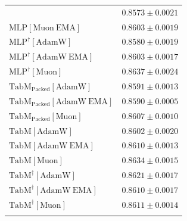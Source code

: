 \begin{longtable}{p{}p{}}
{\begin{tabular}{ll}
{\footnotesize $\mathrm{MLP[Muon]}$ } & {\footnotesize$0.8573 \pm 0.0021$}\\ 
{\footnotesize $\mathrm{MLP[Muon\ EMA]}$ } & {\footnotesize$0.8603 \pm 0.0019$}\\ 
{\footnotesize $\mathrm{MLP^\dagger[AdamW]}$ } & {\footnotesize$0.8580 \pm 0.0019$}\\ 
{\footnotesize $\mathrm{MLP^\dagger[AdamW\ EMA]}$ } & {\footnotesize$0.8603 \pm 0.0017$}\\ 
{\footnotesize $\mathrm{MLP^\dagger[Muon]}$ } & {\footnotesize$0.8637 \pm 0.0024$}\\ 
{\footnotesize $\mathrm{TabM_{\text{Packed}}[AdamW]}$ } & {\footnotesize$0.8591 \pm 0.0013$}\\ 
{\footnotesize $\mathrm{TabM_{\text{Packed}}[AdamW\ EMA]}$ } & {\footnotesize$0.8590 \pm 0.0005$}\\ 
{\footnotesize $\mathrm{TabM_{\text{Packed}}[Muon]}$ } & {\footnotesize$0.8607 \pm 0.0010$}\\ 
{\footnotesize $\mathrm{TabM[AdamW]}$ } & {\footnotesize$0.8602 \pm 0.0020$}\\ 
{\footnotesize $\mathrm{TabM[AdamW\ EMA]}$ } & {\footnotesize$0.8610 \pm 0.0013$}\\ 
{\footnotesize $\mathrm{TabM[Muon]}$ } & {\footnotesize$0.8634 \pm 0.0015$}\\ 
{\footnotesize $\mathrm{TabM^\dagger[AdamW]}$ } & {\footnotesize$0.8621 \pm 0.0017$}\\ 
{\footnotesize $\mathrm{TabM^\dagger[AdamW\ EMA]}$ } & {\footnotesize$0.8610 \pm 0.0017$}\\ 
{\footnotesize $\mathrm{TabM^\dagger[Muon]}$ } & {\footnotesize$0.8611 \pm 0.0014$}\\ 
\bottomrule
\end{tabular}}

&

\topalign{
\centering
\setlength\tabcolsep{2.5pt}
\renewcommand{\arraystretch}{0.8}
\begin{tabular}{ll}


\end{tabular}}
\end{longtable}
